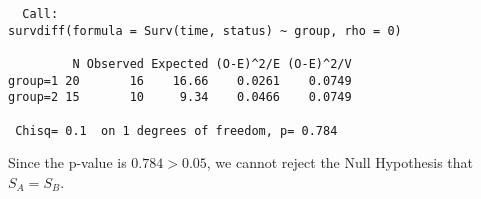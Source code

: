 \documentclass[letterpaper,11pt]{article}
\begin{document}
\begin{lstlisting}
  Call:
survdiff(formula = Surv(time, status) ~ group, rho = 0)

         N Observed Expected (O-E)^2/E (O-E)^2/V
group=1 20       16    16.66    0.0261    0.0749
group=2 15       10     9.34    0.0466    0.0749

 Chisq= 0.1  on 1 degrees of freedom, p= 0.784
\end{lstlisting}
Since the p-value is $0.784 > 0.05$, we cannot reject the Null Hypothesis that $S_A = S_B$.
\end{document}
